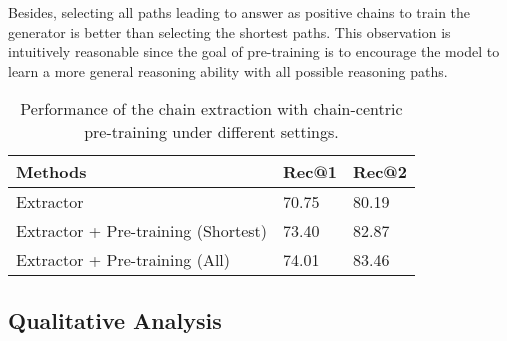 \documentclass[11pt]{article}
\begin{document}
	Besides, selecting all paths leading to answer as positive chains to train the generator is better than selecting the shortest paths. 
	This observation is intuitively reasonable since the goal of pre-training is to encourage the model to learn a more general reasoning ability with all possible reasoning paths. 
	\begin{table}[h]
	\small
		\centering
		\begin{tabular}{lll}
			\hline
			Methods                               & Rec@1 & Rec@2 \\ \hline
Extractor    & 70.75      &  80.19  \\
			Extractor + Pre-training (Shortest) & 73.40 & 82.87       \\ 
			Extractor + Pre-training (All) & 74.01 & 83.46       \\ \hline
		\end{tabular}
		\caption{Performance of the chain extraction with chain-centric pre-training under different settings.}
		\label{tab:pre-training}
	\end{table}
	\subsection{Qualitative Analysis}
	
	\mydata
\end{document}
